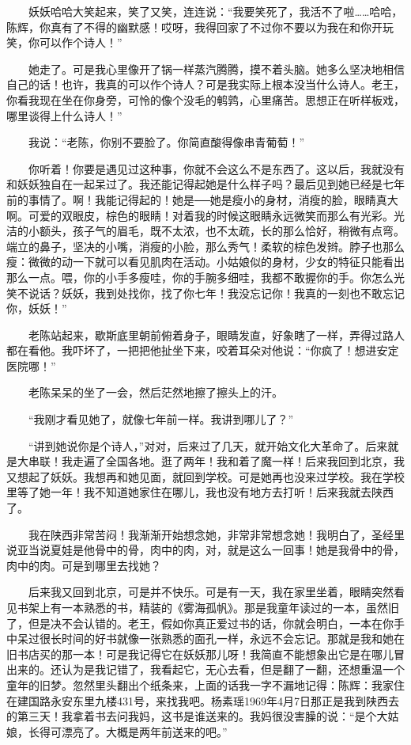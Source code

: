 　　妖妖哈哈大笑起来，笑了又笑，连连说：“我要笑死了，我活不了啦……哈哈，陈辉，你真有了不得的幽默感！哎呀，我得回家了不过你不要以为我在和你开玩笑，你可以作个诗人！” 
 
 　　她走了。可是我心里像开了锅一样蒸汽腾腾，摸不着头脑。她多么坚决地相信自己的话！也许，我真的可以作个诗人？可是我实际上根本没当什么诗人。老王，你看我现在坐在你身旁，可怜的像个没毛的鹌鹑，心里痛苦。思想正在听样板戏，哪里谈得上什么诗人！” 
 
 　　我说：“老陈，你别不要脸了。你简直酸得像串青葡萄！” 
 
 　　你听着！你要是遇见过这种事，你就不会这么不是东西了。这以后，我就没有和妖妖独自在一起呆过了。我还能记得起她是什么样子吗？最后见到她已经是七年前的事情了。啊！我能记得起的！她是──她是瘦小的身材，消瘦的脸，眼睛真大啊。可爱的双眼皮，棕色的眼睛！对着我的时候这眼睛永远微笑而那么有光彩。光洁的小额头，孩子气的眉毛，既不太浓，也不太疏，长的那么恰好，稍微有点弯。端立的鼻子，坚决的小嘴，消瘦的小脸，那么秀气！柔软的棕色发辫。脖子也那么瘦：微微的动一下就可以看见肌肉在活动。小姑娘似的身材，少女的特征只能看出那么一点。喂，你的小手多瘦哇，你的手腕多细哇，我都不敢握你的手。你怎么光笑不说话？妖妖，我到处找你，找了你七年！我没忘记你！我真的一刻也不敢忘记你，妖妖！” 
 
 　　老陈站起来，歇斯底里朝前俯着身子，眼睛发直，好象瞎了一样，弄得过路人都在看他。我吓坏了，一把把他扯坐下来，咬着耳朵对他说：“你疯了！想进安定医院哪！” 
 
 　　老陈呆呆的坐了一会，然后茫然地擦了擦头上的汗。 
 
 　　“我刚才看见她了，就像七年前一样。我讲到哪儿了？” 
 
 　　“讲到她说你是个诗人，”对对，后来过了几天，就开始文化大革命了。后来就是大串联！我走遍了全国各地。逛了两年！我和着了魔一样！后来我回到北京，我又想起了妖妖。我想再和她见面，就回到学校。可是她再也没来过学校。我在学校里等了她一年！我不知道她家住在哪儿，我也没有地方去打听！后来我就去陕西了。 
 
 　　我在陕西非常苦闷！我渐渐开始想念她，非常非常想念她！我明白了，圣经里说亚当说夏娃是他骨中的骨，肉中的肉，对，就是这么一回事！她是我骨中的骨，肉中的肉。可是到哪里去找她？ 
 
 　　后来我又回到北京，可是并不快乐。可是有一天，我在家里坐着，眼睛突然看见书架上有一本熟悉的书，精装的《雾海孤帆》。那是我童年读过的一本，虽然旧了，但是决不会认错的。老王，假如你真正爱过书的话，你就会明白，一本在你手中呆过很长时间的好书就像一张熟悉的面孔一样，永远不会忘记。那就是我和她在旧书店买的那一本！可是我记得它在妖妖那儿呀！我简直不能想象出它是在哪儿冒出来的。还认为是我记错了，我看起它，无心去看，但是翻了一翻，还想重温一个童年的旧梦。忽然里头翻出个纸条来，上面的话我一字不漏地记得：陈辉：我家住在建国路永安东里九楼431号，来找我吧。杨素瑶1969年4月7日那正是我到陕西去的第三天！我拿着书去问我妈，这书是谁送来的。我妈很没害臊的说：“是个大姑娘，长得可漂亮了。大概是两年前送来的吧。” 
 
